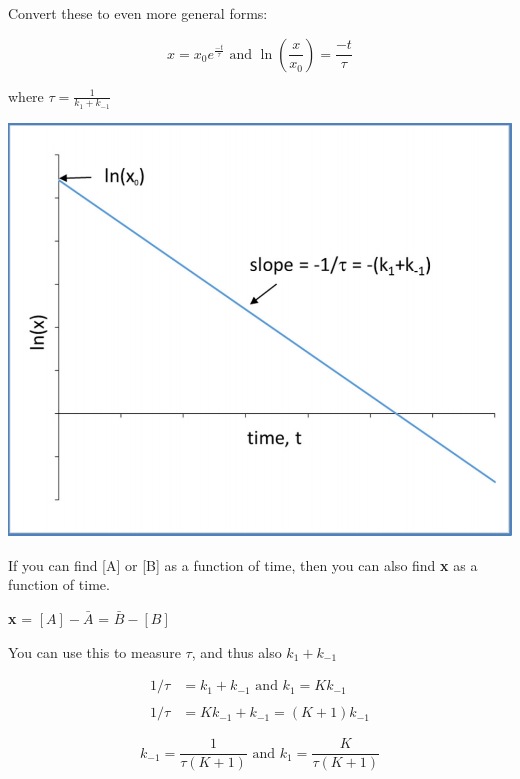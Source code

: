 \documentclass[12pt, letterpaper]{article}
\begin{document}
    Convert these to even more general forms:

    \begin{equation}
        x = x_0e^{\frac{-t}{\tau}} \text{ and } \ln(\frac{x}{x_0}) = \frac{-t}{\tau}
    \end{equation}
    
    where \( \tau = \frac{1}{k_1 + k_{-1}} \)

    \begin{center}
        \includegraphics[scale = 0.4]{ln(x) vs. time.png}
    \end{center}
    
    If you can find [A] or [B] as a function of time, then you can also find \textbf{x} as a function of time. 

    \textbf{x} = $[A] - \bar{A}$ = $\bar{B} - [B]$

    You can use this to measure $\tau$, and thus also \(k_1 + k_{-1} \)

    \begin{align*}
        1/\tau &= k_1 + k_{-1} \text{ and } k_1 = Kk_{-1} \\ \\ 
        1/\tau &= Kk_{-1} + k_{-1} = (K+1)k_{-1}
    \end{align*}

    \begin{equation*}
        k_{-1} = \frac{1}{\tau(K + 1)} \text{ and } k_1 = \frac{K}{\tau(K + 1)}
    \end{equation*}
\end{document}
